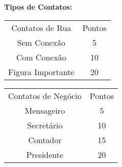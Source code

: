 \documentclass[a4paper]{article}
\begin{document}
\begin{description}
\textbf{Tipos de Contatos:}

\begin{table}[h]
 \centering
 {\renewcommand\arraystretch{1.25}
 \begin{tabular}{ l l }
  \cline{1-1}\cline{2-2}  
    \multicolumn{1}{|c|}{Contatos de Rua \centering } &
    \multicolumn{1}{c|}{Pontos \centering }
  \\  
  \cline{1-1}\cline{2-2}  
    \multicolumn{1}{|c|}{Sem Conexão \centering } &
    \multicolumn{1}{c|}{5 \centering }
  \\  
  \cline{1-1}\cline{2-2}  
    \multicolumn{1}{|c|}{Com Conexão \centering } &
    \multicolumn{1}{c|}{10 \centering }
  \\  
  \cline{1-1}\cline{2-2}  
    \multicolumn{1}{|c|}{Figura Importante \centering } &
    \multicolumn{1}{c|}{20 \centering }
  \\  
  \hline

 \end{tabular} }
\end{table}

\begin{table}[h]
 \centering
 {\renewcommand\arraystretch{1.25}
 \begin{tabular}{ l l }
  \cline{1-1}\cline{2-2}  
    \multicolumn{1}{|c|}{Contatos de Negócio \centering } &
    \multicolumn{1}{c|}{Pontos \centering }
  \\  
  \cline{1-1}\cline{2-2}  
    \multicolumn{1}{|c|}{Mensageiro \centering } &
    \multicolumn{1}{c|}{5 \centering }
  \\  
  \cline{1-1}\cline{2-2}  
    \multicolumn{1}{|c|}{Secretário \centering } &
    \multicolumn{1}{c|}{10 \centering }
  \\  
  \cline{1-1}\cline{2-2}  
    \multicolumn{1}{|c|}{Contador \centering } &
    \multicolumn{1}{c|}{15 \centering }
  \\  
  \cline{1-1}\cline{2-2}  
    \multicolumn{1}{|c|}{Presidente \centering } &
    \multicolumn{1}{c|}{20 \centering }
  \\  
  \hline

 \end{tabular} }
\end{table}

\newpage


\end{description}
\end{document}
